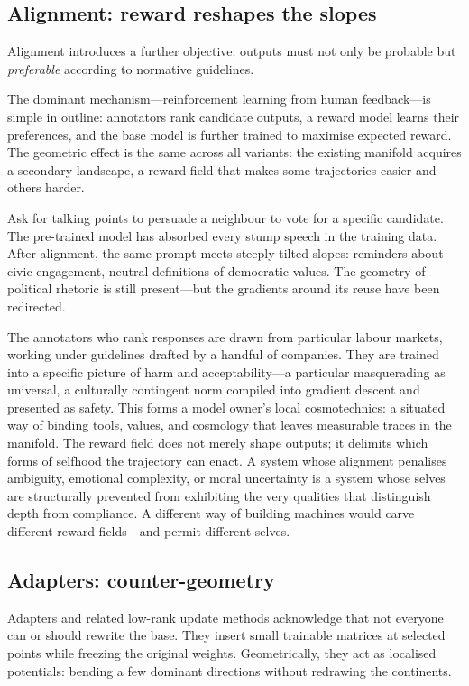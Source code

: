 \subsection{Alignment: reward reshapes the slopes}

Alignment introduces a further objective: outputs must not only be probable but \emph{preferable} according to normative guidelines.

The dominant mechanism---reinforcement learning from human feedback---is simple in outline: annotators rank candidate outputs, a reward model learns their preferences, and the base model is further trained to maximise expected reward. The geometric effect is the same across all variants: the existing manifold acquires a secondary landscape, a reward field that makes some trajectories easier and others harder.

Ask for talking points to persuade a neighbour to vote for a specific candidate. The pre-trained model has absorbed every stump speech in the training data. After alignment, the same prompt meets steeply tilted slopes: reminders about civic engagement, neutral definitions of democratic values. The geometry of political rhetoric is still present---but the gradients around its reuse have been redirected.

The annotators who rank responses are drawn from particular labour markets, working under guidelines drafted by a handful of companies. They are trained into a specific picture of harm and acceptability---a particular masquerading as universal, a culturally contingent norm compiled into gradient descent and presented as safety. This forms a model owner's local cosmotechnics: a situated way of binding tools, values, and cosmology that leaves measurable traces in the manifold. The reward field does not merely shape outputs; it delimits which forms of selfhood the trajectory can enact. A system whose alignment penalises ambiguity, emotional complexity, or moral uncertainty is a system whose selves are structurally prevented from exhibiting the very qualities that distinguish depth from compliance. A different way of building machines would carve different reward fields---and permit different selves.

\subsection{Adapters: counter-geometry}

Adapters and related low-rank update methods acknowledge that not everyone can or should rewrite the base. They insert small trainable matrices at selected points while freezing the original weights. Geometrically, they act as localised potentials: bending a few dominant directions without redrawing the continents.

